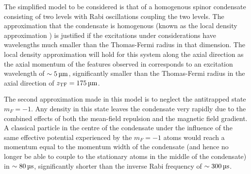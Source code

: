 The simplified model to be considered is that of a homogenous spinor condensate consisting of two levels with Rabi oscillations coupling the two levels. The approximation that the condensate is homogenous (known as the local density approximation \cite{Stamper-Kurn:1999,Zambelli:2000}) is justified if the excitations under considerations have wavelengths much smaller than the Thomas-Fermi radius in that dimension. The local density approximation will hold for this system along the axial direction as the axial momentum of the features observed in  corresponds to an excitation wavelength of $\sim \unit[5]{\micro m}$, significantly smaller than the Thomas-Fermi radius in the axial direction of $z_\text{TF} = \unit[175]{\micro m}$. 

The second approximation made in this model is to neglect the antitrapped state $m_F=-1$. Any density in this state leaves the condensate very rapidly due to the combined effects of both the mean-field repulsion and the magnetic field gradient. A classical particle in the centre of the condensate under the influence of the same effective potential experienced by the $m_F=-1$ atoms would reach a momentum equal to the momentum width of the condensate (and hence no longer be able to couple to the stationary atoms in the middle of the condensate) in $\sim\unit[80]{\micro s}$, significantly shorter than the inverse Rabi frequency of $\sim \unit[300]{\micro s}$.

